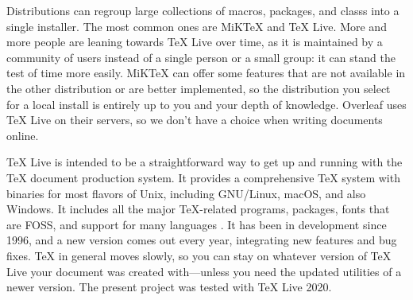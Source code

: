 Distributions can regroup large collections of \glspl{macro}, \glspl{package}, and \glspl{class} into a single installer. The most common ones are MiK\TeX{} and \TeX{} Live. More and more people are leaning towards \TeX{} Live over time, as it is maintained by a community of users instead of a single person or a small group: it can stand the test of time more easily. MiK\TeX{} can offer some features that are not available in the other distribution or are better implemented, so the distribution you select for a local install is entirely up to you and your depth of knowledge. Overleaf uses \TeX{} Live on their servers, so we don't have a choice when writing documents online.

\TeX{} Live is intended to be a straightforward way to get up and running with the \TeX{} document production system. It provides a comprehensive \TeX{} system with binaries for most flavors of Unix, including GNU/Linux, macOS, and also Windows. It includes all the major \TeX{}-related programs, \glspl{package}, fonts that are \gls{FOSS}, and support for many languages \parencite{web:tex-live}. It has been in development since 1996, and a new version comes out every year, integrating new features and bug fixes. \TeX{} in general moves slowly, so you can stay on whatever version of \TeX{} Live your document was created with---unless you need the updated utilities of a newer version. The present project was tested with \TeX{} Live 2020.
